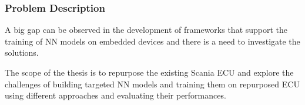 

\subsubsection{Problem Description}
A big gap can be observed in the development of frameworks that support the training of NN models on embedded devices and there is a need to investigate the solutions. 

The scope of the thesis is to repurpose the existing Scania ECU and explore the challenges of building targeted NN models and training them on repurposed ECU using different approaches and evaluating their performances.




